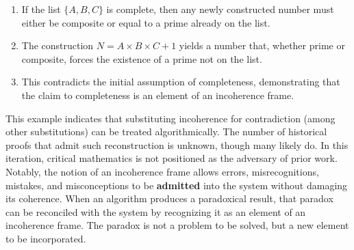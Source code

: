 \documentclass[12pt]{book}
\begin{document}
\begin{enumerate}
\item If the list $\{A, B, C\}$ is complete, then any newly constructed number must either be composite or equal to a prime already on the list.
\item The construction $N = A \times B \times C + 1$ yields a number that, whether prime or composite, forces the existence of a prime not on the list.
\item This contradicts the initial assumption of completeness, demonstrating that the claim to completeness is an element of an incoherence frame. 
\end{enumerate}


This example indicates that substituting incoherence for contradiction (among other substitutions) can be treated algorithmically. The number of historical proofs that admit such reconstruction is unknown, though many likely do. In this iteration, critical mathematics is not positioned as the adversary of prior work. Notably, the notion of an incoherence frame allows errors, misrecognitions, mistakes, and misconceptions to be \textbf{admitted} into the system without damaging its coherence.\label{def:admitting_incoherence} When an algorithm produces a paradoxical result, that paradox can be reconciled with the system by recognizing it as an element of an incoherence frame. The paradox is not a problem to be solved, but a new element to be incorporated.
\end{document}
